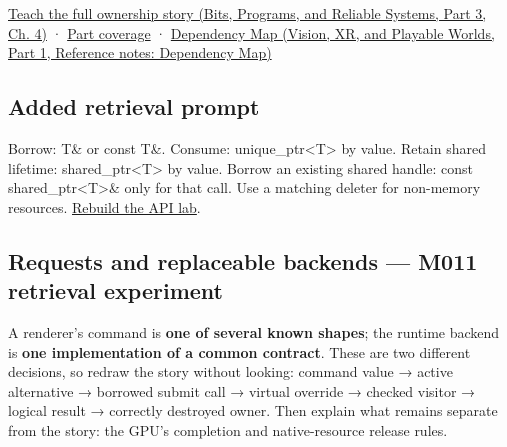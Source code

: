 \href{../01-Bits-Programs-and-Reliable-Systems-P03/main.pdf\#01-foundations-i-ch004-from-a-live-object-to-responsible-resource-ownership}{Teach the full ownership story (Bits, Programs, and Reliable Systems, Part 3, Ch. 4)} · \hyperref[appendix-fd090d982a15-m010---parts-148-160]{Part coverage} · \href{../07-Vision-XR-and-Playable-Worlds-P01/main.pdf\#appendix-4ad47bdd269a}{Dependency Map (Vision, XR, and Playable Worlds, Part 1, Reference notes: Dependency Map)}

\subsection{Added retrieval prompt}\label{appendix-960160274237-added-retrieval-prompt}

\hypertarget{appendix-960160274237-added-retrieval-prompt}{}

Borrow: T\& or const T\&. Consume: unique\_ptr\textless T\textgreater{} by value. Retain shared lifetime: shared\_ptr\textless T\textgreater{} by value. Borrow an existing shared handle: const shared\_ptr\textless T\textgreater{}\& only for that call. Use a matching deleter for non-memory resources. \hyperref[01-foundations-i-ch003-worked-api-choice-borrow-consume-retain-or-copy-a-value]{Rebuild the API lab}.

\subsection{Requests and replaceable backends --- M011 retrieval experiment}\label{appendix-960160274237-requests-and-replaceable-backends-m011-retrieval-experiment}

\hypertarget{appendix-960160274237-requests-and-replaceable-backends-m011-retrieval-experiment}{}

A renderer's command is \textbf{one of several known shapes}; the runtime backend is \textbf{one implementation of a common contract}. These are two different decisions, so redraw the story without looking: command value → active alternative → borrowed submit call → virtual override → checked visitor → logical result → correctly destroyed owner. Then explain what remains separate from the story: the GPU's completion and native-resource release rules.


